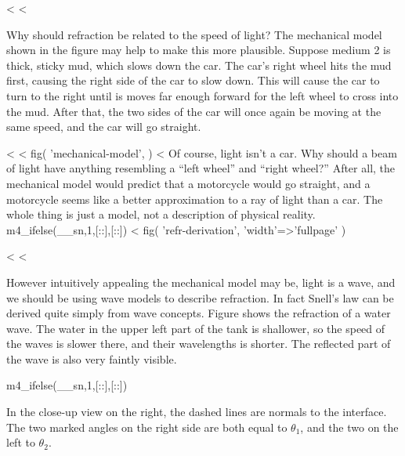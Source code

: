 <%
<%

Why should refraction be related to the speed of light? The
mechanical model shown in the figure may help to make this
more plausible. Suppose medium 2 is thick, sticky mud, which
slows down the car. The car's right wheel hits the mud
first, causing the right side of the car to slow down. This
will cause the car to turn to the right until is moves far
enough forward for the left wheel to cross into the mud.
After that, the two sides of the car will once again be
moving at the same speed, and the car will go straight.

<%
<%
  fig(
    'mechanical-model',
  )
<%
Of course, light isn't a car. Why should a beam of light
have anything resembling a ``left wheel'' and ``right
wheel?'' After all, the mechanical model would predict that
a motorcycle would go straight, and a motorcycle seems like
a better approximation to a ray of light than a car. The
whole thing is just a model, not a description of physical reality.
m4_ifelse(__sn,1,[::],[:\vspace{0mm plus 5mm}:])
<%
  fig(
    'refr-derivation',
    {
      'width'=>'fullpage'
    }
  )

<%
<%

However intuitively appealing the mechanical model may be,
light is a wave, and we should be using wave models to
describe refraction. In fact Snell's law can be derived
quite simply from wave concepts. Figure  shows
the refraction of a water wave. The water in the upper left part of the tank
is shallower, so the speed of the waves is slower there, and their
wavelengths is shorter. The reflected part of the wave is also very faintly
visible.

m4_ifelse(__sn,1,[::],[:\pagebreak:])

In the close-up view on the right, the dashed lines are normals to the
interface. The two marked angles on the right side are both equal to
$\theta_1$, and the two on the left to $\theta_2$.

